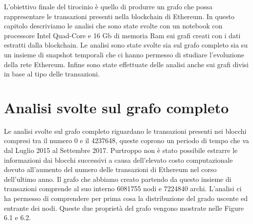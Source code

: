 \documentclass[12pt]{report}
\begin{document}
L'obiettivo finale del tirocinio è quello di produrre un grafo che possa rappresentare le transazioni presenti nella blockchain di Ethereum. In questo capitolo descriviamo le analisi che sono state svolte con un notebook con processore Intel Quad-Core e 16 Gb di memoria Ram sui grafi creati con i dati estratti dalla blockchain.
\newline
Le analisi sono state svolte sia sul grafo completo sia su un insieme di snapshot temporali che ci hanno permesso di studiare l'evoluzione della rete Ethereum.
Infine sono state effettuate delle analisi anche sui grafi divisi in base al tipo delle transazioni.

\section{Analisi svolte sul grafo completo}

Le analisi svolte sul grafo completo riguardano le transazioni presenti nei blocchi compresi tra il numero 0 e il 4237648, queste coprono un periodo di tempo che va dal Luglio 2015 al Settembre 2017. Purtroppo non è stato possibile estrarre le informazioni dai blocchi successivi a causa dell'elevato costo computazionale dovuto all'aumento del numero delle transazioni di Ethereum nel corso dell'ultimo anno.
Il grafo che abbiamo creato partendo da questo insieme di transazioni comprende al suo interno 6081755 nodi e 7224840 archi.
L'analisi ci ha permesso di comprendere per prima cosa la distribuzione del grado uscente ed entrante dei nodi.
Queste due proprietà del grafo vengono mostrate nelle Figure 6.1 e 6.2.
\end{document}
